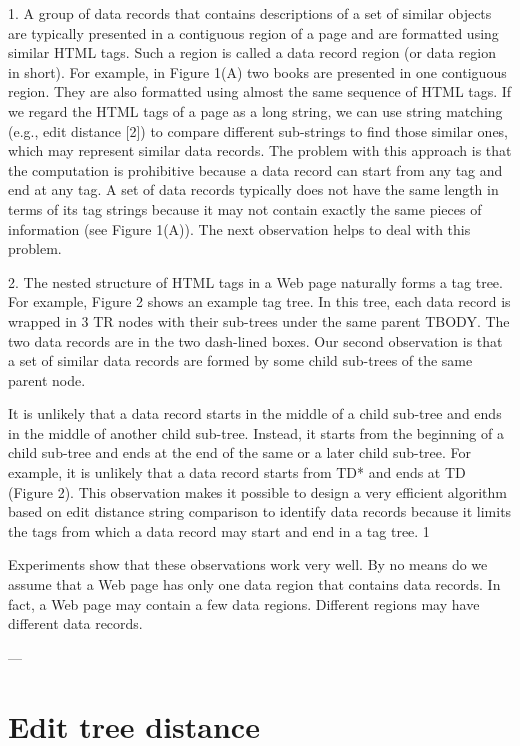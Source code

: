 1. A group of data records that contains descriptions of a set of
similar objects are typically presented in a contiguous region
of a page and are formatted using similar HTML tags. Such a
region is called a data record region (or data region in short).
For example, in Figure 1(A) two books are presented in one
contiguous region. They are also formatted using almost the
same sequence of HTML tags. If we regard the HTML tags of
a page as a long string, we can use string matching (e.g., edit
distance [2]) to compare different sub-strings to find those
similar ones, which may represent similar data records.
The problem with this approach is that the computation is
prohibitive because a data record can start from any tag and
end at any tag. A set of data records typically does not have
the same length in terms of its tag strings because it may not
contain exactly the same pieces of information (see Figure
1(A)). The next observation helps to deal with this problem.

2. The nested structure of HTML tags in a Web page naturally
forms a tag tree. For example, Figure 2 shows an example tag
tree. In this tree, each data record is wrapped in 3 TR nodes
with their sub-trees under the same parent TBODY. The two
data records are in the two dash-lined boxes. Our second
observation is that a set of similar data records are formed by
some child sub-trees of the same parent node.

It is unlikely that a data record starts in the middle of a child
sub-tree and ends in the middle of another child sub-tree.
Instead, it starts from the beginning of a child sub-tree and
ends at the end of the same or a later child sub-tree. For
example, it is unlikely that a data record starts from TD* and
ends at TD (Figure 2). This observation makes it possible to
design a very efficient algorithm based on edit distance string
comparison to identify data records because it limits the tags
from which a data record may start and end in a tag tree. 1

Experiments show that these observations work very well. By no
means do we assume that a Web page has only one data region
that contains data records. In fact, a Web page may contain a few
data regions. Different regions may have different data records.

---

\section{Edit tree distance}

